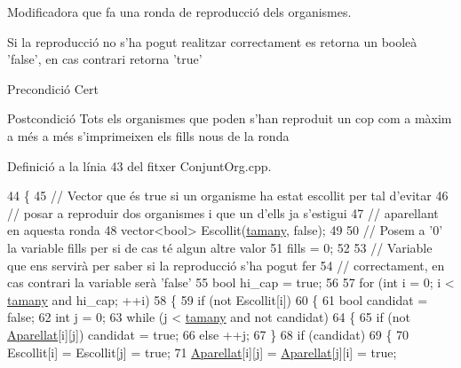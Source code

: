 Modificadora que fa una ronda de reproducció dels organismes. 

Si la reproducció no s'ha pogut realitzar correctament es retorna un booleà 'false', en cas contrari retorna 'true'

\begin{DoxyPrecond}{Precondició}
Cert 
\end{DoxyPrecond}
\begin{DoxyPostcond}{Postcondició}
Tots els organismes que poden s'han reproduit un cop com a màxim a més a més s'imprimeixen els fills nous de la ronda 
\end{DoxyPostcond}


Definició a la línia 43 del fitxer Conjunt\-Org.\-cpp.


\begin{DoxyCode}
44 \{
45     \textcolor{comment}{// Vector que és true si un organisme ha estat escollit per tal d'evitar}
46     \textcolor{comment}{// posar a reproduir dos organismes i que un d'ells ja s'estigui}
47     \textcolor{comment}{// aparellant en aquesta ronda}
48     vector<bool> Escollit(\hyperlink{class_conjunt_org_a468e7686498561628ad731ea196df8b5}{tamany}, \textcolor{keyword}{false});
49     
50     \textcolor{comment}{// Posem a '0' la variable fills per si de cas té algun altre valor}
51     fills = 0;
52     
53     \textcolor{comment}{// Variable que ens servirà per saber si la reproducció s'ha pogut fer}
54     \textcolor{comment}{// correctament, en cas contrari la variable serà 'false'}
55     \textcolor{keywordtype}{bool} hi\_cap = \textcolor{keyword}{true};
56     
57     \textcolor{keywordflow}{for} (\textcolor{keywordtype}{int} i = 0; i < \hyperlink{class_conjunt_org_a468e7686498561628ad731ea196df8b5}{tamany} and hi\_cap; ++i)
58     \{
59         \textcolor{keywordflow}{if} (not Escollit[i]) 
60         \{
61             \textcolor{keywordtype}{bool} candidat = \textcolor{keyword}{false};
62             \textcolor{keywordtype}{int} j = 0;
63             \textcolor{keywordflow}{while} (j < \hyperlink{class_conjunt_org_a468e7686498561628ad731ea196df8b5}{tamany} and not candidat)
64             \{
65                 \textcolor{keywordflow}{if} (not \hyperlink{class_conjunt_org_a9782fdb4c89e8dd61762453de8f77fcb}{Aparellat}[i][j]) candidat = \textcolor{keyword}{true};
66                 \textcolor{keywordflow}{else} ++j;
67             \}
68             \textcolor{keywordflow}{if} (candidat)
69             \{
70                 Escollit[i] = Escollit[j] = \textcolor{keyword}{true};
71                 \hyperlink{class_conjunt_org_a9782fdb4c89e8dd61762453de8f77fcb}{Aparellat}[i][j] = \hyperlink{class_conjunt_org_a9782fdb4c89e8dd61762453de8f77fcb}{Aparellat}[j][i] = \textcolor{keyword}{true};

\end{DoxyCode}
